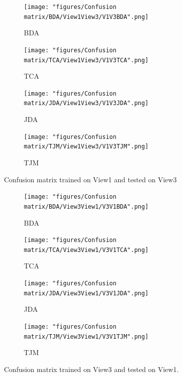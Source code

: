 \begin{figure}[]
	\begin{subfigure}{.5\textwidth}
		\centering
		\texttt{[image: "figures/Confusion matrix/BDA/View1View3/V1V3BDA".png]}
		\caption{BDA}
		\label{fig:V1V3BDA}
	\end{subfigure}%
	\begin{subfigure}{.5\textwidth}
		\centering
		\texttt{[image: "figures/Confusion matrix/TCA/View1View3/V1V3TCA".png]}
		\caption{TCA}
		\label{fig:V1V3TCA}
	\end{subfigure}
	\begin{subfigure}{.5\textwidth}
		\centering
		\texttt{[image: "figures/Confusion matrix/JDA/View1View3/V1V3JDA".png]}
		\caption{JDA}
		\label{fig:V1V3JDA}
	\end{subfigure}%
	\begin{subfigure}{.5\textwidth}
		\centering
		\texttt{[image: "figures/Confusion matrix/TJM/View1View3/V1V3TJM".png]}
		\caption{TJM}
		\label{fig:V1V3TJM}
	\end{subfigure}
	\caption{Confusion matrix trained on View1 and tested on View3}
	\label{fig:CMV1V3}
\end{figure}

\begin{figure}[]
	\begin{subfigure}{.5\textwidth}
		\centering
		\texttt{[image: "figures/Confusion matrix/BDA/View3View1/V3V1BDA".png]}
		\caption{BDA}
		\label{fig:V3V1BDA}
	\end{subfigure}%
	\begin{subfigure}{.5\textwidth}
		\centering
		\texttt{[image: "figures/Confusion matrix/TCA/View3View1/V3V1TCA".png]}
		\caption{TCA}
		\label{fig:V3V1TCA}
	\end{subfigure}
	\begin{subfigure}{.5\textwidth}
		\centering
		\texttt{[image: "figures/Confusion matrix/JDA/View3View1/V3V1JDA".png]}
		\caption{JDA}
		\label{fig:V3V1JDA}
	\end{subfigure}%
	\begin{subfigure}{.5\textwidth}
		\centering
		\texttt{[image: "figures/Confusion matrix/TJM/View3View1/V3V1TJM".png]}
		\caption{TJM}
		\label{fig:V3V1TJM}
	\end{subfigure}
	\caption{Confusion matrix trained on View3 and tested on View1.}
	\label{fig:CMV3V1}
\end{figure}

